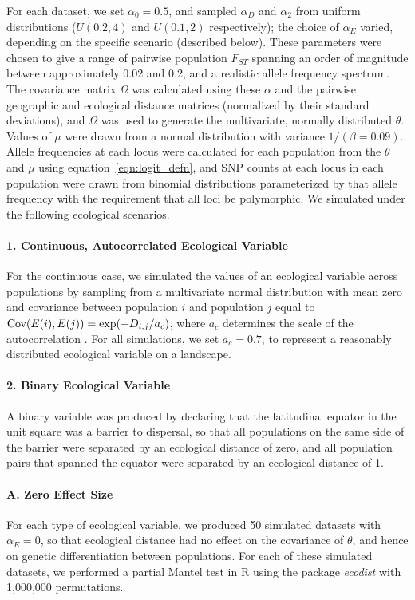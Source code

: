 For each dataset, we set $\alpha_{0} =0.5$, and sampled $\alpha_{D}$ and $\alpha_2$ from uniform distributions ($U(0.2,4)$ and $U(0.1,2)$ respectively); the choice of $\alpha_E$ varied, depending on the specific scenario (described below).  These parameters were chosen to give a range of pairwise population $F_{ST}$ spanning an order of magnitude between approximately 0.02 and 0.2, and a realistic allele frequency spectrum.
The covariance matrix $\Omega$ was calculated using these $\alpha$ and the pairwise geographic and ecological distance matrices (normalized by their standard deviations), 
and $\Omega$ was used to generate the multivariate, normally distributed $\theta$. 
Values of $\mu$ were drawn from a normal distribution with variance $1/(\beta=0.09)$.
Allele frequencies at each locus were calculated for each population from the $\theta$ and $\mu$ using equation~\eqref{eqn:logit_defn}, and SNP counts at each locus in each population were drawn from binomial distributions parameterized by that allele frequency with the requirement that all loci be polymorphic.   We simulated under the following ecological scenarios.

\paragraph{1. Continuous, Autocorrelated Ecological Variable}
For the continuous case, we simulated the values of an ecological variable across populations by sampling from a multivariate normal distribution with mean zero and covariance between population $i$ and population $j$ equal to $\mathop{\mbox{Cov}}(E(i),E(j)) = \exp(-D_{i,j}/a_{c})$, where $a_{c}$ determines the scale of the autocorrelation \citep[following][]{Guillot2013}.  For all simulations, we set $a_{c}= 0.7$, 
to represent a reasonably distributed ecological variable on a landscape.

\paragraph{2. Binary Ecological Variable} A binary variable was produced by declaring that the latitudinal equator in the unit square was a barrier to dispersal, so that all populations on the same side of the barrier were separated by an ecological distance of zero, and all population pairs that spanned the equator were separated by an ecological distance of 1.

\paragraph{A. Zero Effect Size} For each type of ecological variable, we produced 50 simulated datasets with $\alpha_{E}=0$, so that ecological distance had no effect on the covariance of $\theta$, and hence on genetic differentiation between populations.  For each of these simulated datasets, we performed a partial Mantel test in R using the package \textit{ecodist} \citep{ecodist} with 1,000,000 permutations. 
	
